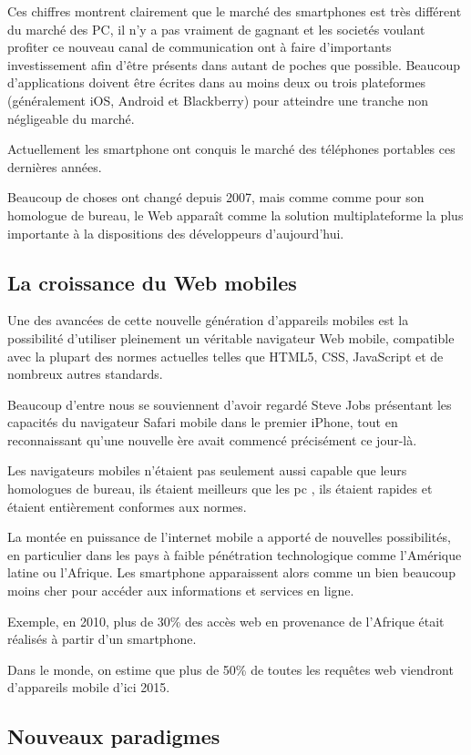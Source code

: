 Ces chiffres montrent clairement que le marché des smartphones est très différent du marché des PC, il n’y a pas vraiment de gagnant et les societés voulant profiter ce nouveau canal de communication ont à faire d’importants investissement afin d’être présents dans autant de poches que possible. Beaucoup d’applications doivent être écrites dans au moins deux ou trois plateformes (généralement iOS, Android et Blackberry) pour atteindre une tranche non négligeable du marché.

Actuellement les smartphone ont conquis le marché des téléphones portables ces dernières années.

Beaucoup de choses ont changé depuis 2007, mais comme comme pour son homologue de bureau, le Web apparaît comme la solution multiplateforme la plus importante à la dispositions des développeurs d’aujourd’hui.

\subsection{La croissance du Web mobiles}

Une des avancées de cette nouvelle génération d’appareils mobiles est la possibilité d’utiliser pleinement un véritable navigateur Web mobile, compatible avec la plupart des normes actuelles telles que HTML5, CSS, JavaScript et de nombreux autres standards.

Beaucoup d’entre nous se souviennent d'avoir regardé Steve Jobs présentant les capacités du navigateur Safari mobile dans le premier iPhone, tout en reconnaissant qu’une nouvelle ère avait commencé précisément ce jour-là.

Les navigateurs mobiles n'étaient pas seulement aussi capable que leurs homologues de bureau, ils étaient meilleurs que les pc , ils étaient rapides et étaient entièrement conformes aux normes.

La montée en puissance de l’internet mobile a apporté de nouvelles possibilités, en particulier dans les pays à faible pénétration technologique comme l’Amérique latine ou l’Afrique. Les smartphone apparaissent alors comme un bien beaucoup moins cher pour accéder aux informations et services en ligne.

Exemple, en 2010, plus de 30\% des accès web en provenance de l’Afrique était réalisés à partir d’un smartphone.

Dans le monde, on estime que plus de 50\% de toutes les requêtes web viendront d’appareils mobile d’ici 2015.

\subsection{Nouveaux paradigmes}

